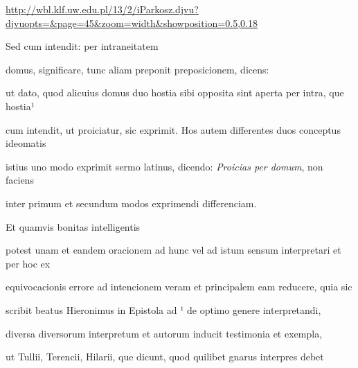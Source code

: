
\newParkoszpage

\url{http://wbl.klf.uw.edu.pl/13/2/iParkosz.djvu?djvuopts=&page=45&zoom=width&showposition=0.5,0.18}

\fullpreviouslines


{
\color{blue}

Sed cum intendit: per intraneitatem

domus, significare, tunc aliam preponit preposicionem, dicens: 

}



\fulllines{}
ut dato, quod alicuius domus duo hostia sibi opposita sint aperta per intra, que hostia¹

cum intendit, ut proiciatur, sic exprimit. Hos autem differentes duos conceptus ideomatis

istius uno modo exprimit sermo latinus, dicendo: \textit{Proicias per domum}, non faciens

\splitlines{}

inter primum et secundum modos exprimendi differenciam.

\indentK Et quamvis bonitas intelligentis 

\fulllines{}

potest unam et eandem oracionem ad hunc vel ad istum sensum interpretari et per hoc ex

equivocacionis errore ad intencionem veram et principalem eam reducere, quia sic

scribit beatus Hieronimus in Epistola ad ¹ de optimo genere interpretandi,

diversa diversorum interpretum et autorum inducit testimonia et exempla,

ut Tullii, Terencii, Hilarii, que dicunt, quod quilibet gnarus interpres debet

